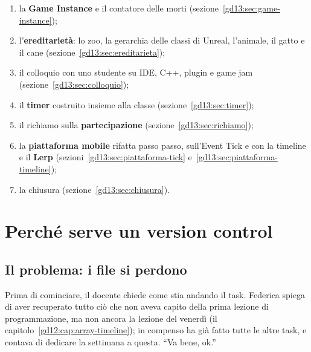 \begin{enumerate}
{        Function} (sezione~\ref{gd13:sec:funzioni});
  \item la \textbf{Game Instance} e il contatore delle morti
        (sezione~\ref{gd13:sec:game-instance});
  \item l'\textbf{ereditarietà}: lo zoo, la gerarchia delle classi di Unreal,
        l'animale, il gatto e il cane (sezione~\ref{gd13:sec:ereditarieta});
  \item il colloquio con uno studente su IDE, C++, plugin e game jam
        (sezione~\ref{gd13:sec:colloquio});
  \item il \textbf{timer} costruito insieme alla classe
        (sezione~\ref{gd13:sec:timer});
  \item il richiamo sulla \textbf{partecipazione}
        (sezione~\ref{gd13:sec:richiamo});
  \item la \textbf{piattaforma mobile} rifatta passo passo, sull'Event Tick e
        con la timeline e il \textbf{Lerp}
        (sezioni~\ref{gd13:sec:piattaforma-tick}
        e~\ref{gd13:sec:piattaforma-timeline});
  \item la chiusura (sezione~\ref{gd13:sec:chiusura}).
\end{enumerate}

\section{Perché serve un version control}
\label{gd13:sec:perche}

\subsection{Il problema: i file si perdono}

Prima di cominciare, il docente chiede come stia andando il task. Federica
spiega di aver recuperato tutto ciò che non aveva capito della prima lezione
di programmazione, ma non ancora la lezione del venerdì (il
capitolo~\ref{gd12:cap:array-timeline}); in compenso ha già fatto tutte le
altre task, e contava di dedicare la settimana a questa. ``Va bene, ok.''

